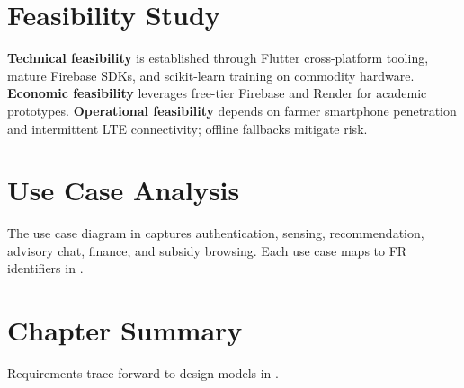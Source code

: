 \section{Feasibility Study}
\textbf{Technical feasibility} is established through Flutter cross-platform tooling, mature Firebase SDKs, and scikit-learn training on commodity hardware. \textbf{Economic feasibility} leverages free-tier Firebase and Render for academic prototypes. \textbf{Operational feasibility} depends on farmer smartphone penetration and intermittent LTE connectivity; offline fallbacks mitigate risk.



\section{Use Case Analysis}
The use case diagram in  captures authentication, sensing, recommendation, advisory chat, finance, and subsidy browsing. Each use case maps to FR identifiers in .

\section{Chapter Summary}
Requirements trace forward to design models in .
